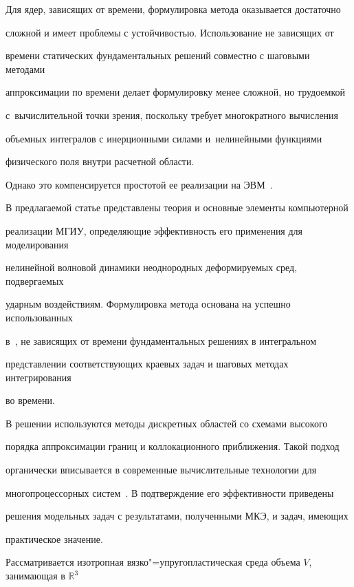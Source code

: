 Для ядер, зависящих от времени, формулировка метода оказывается достаточно

сложной и имеет проблемы с устойчивостью. Использование не зависящих от

времени статических фундаментальных решений совместно с шаговыми методами

аппроксимации по времени делает формулировку менее сложной, но трудоемкой 

с~вычислительной точки зрения, поскольку требует многократного вычисления

объемных интегралов с инерционными силами и~нелинейными функциями

физического поля внутри расчетной области. 

Однако это компенсируется простотой ее реализации на ЭВМ~\cite{petu:bib11}.



В предлагаемой статье представлены теория и основные элементы компьютерной

реализации МГИУ, определяющие эффективность его применения для моделирования

нелинейной волновой динамики неоднородных деформируемых сред, подвергаемых

ударным воздействиям. Формулировка метода основана на успешно использованных

в~\cite{petu:bib12}, не зависящих от времени фундаментальных решениях в интегральном

представлении соответствующих краевых задач и шаговых методах интегрирования

во времени.



В решении используются методы дискретных областей со схемами высокого

порядка аппроксимации границ и коллокационного приближения. Такой подход

органически вписывается в современные вычислительные технологии для

многопроцессорных систем~\cite{petu:bib3}. В подтверждение его эффективности приведены

решения модельных задач с результатами, полученными МКЭ, и задач, имеющих

практическое значение.








Рассматривается изотропная вязко"=упругопластическая среда объема $V$, занимающая в $\mathbb R^3$

